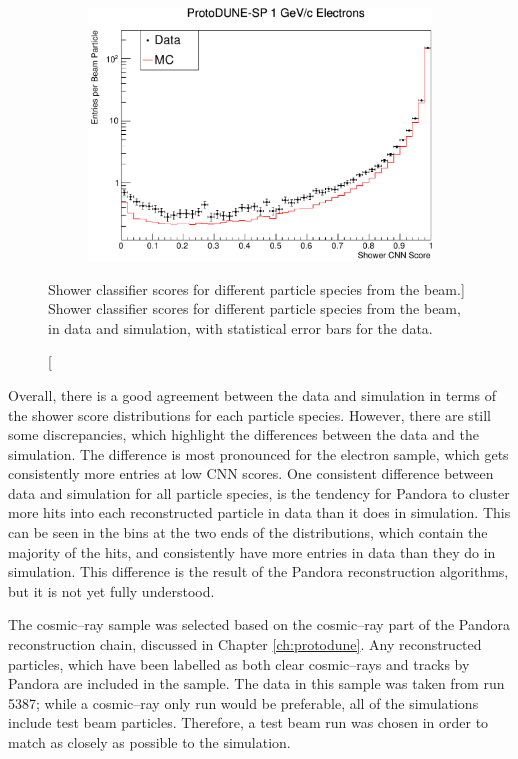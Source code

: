 \begin{figure}
	\begin{subfigure}[b]{0.64\textwidth}
		\centering
		\includegraphics[width=\textwidth]{figures/hit_cnn_electron.pdf}
		\label{fig:beam_electron_cnn}
	\end{subfigure}

	\caption
	[Shower classifier scores for different particle species from the \protodune{} 
	beam.]
	{Shower classifier scores for different particle species from the \protodune{} 
	beam, in data and simulation, with statistical error bars for the data.}
	\label{fig:cnn_scores_beam}

\end{figure}

Overall, there is a good agreement between the data and simulation in terms of
the shower score distributions for each particle species. However, there are
still some discrepancies, which highlight the differences between the data and
the simulation. The difference is most pronounced for the electron sample, which
gets consistently more entries at low CNN scores. One consistent difference
between data and simulation for all particle species, is the tendency for 
Pandora to cluster more hits into each reconstructed particle in data than it 
does in simulation. This can be seen in the bins at the two ends of the 
distributions, which contain the majority of the hits, and consistently have 
more entries in data than they do in simulation. This difference is the result
of the Pandora reconstruction algorithms, but it is not yet fully understood.

The cosmic--ray sample was selected based on the cosmic--ray part of the
Pandora reconstruction chain, discussed in Chapter \ref{ch:protodune}. Any
reconstructed particles, which have been labelled as both clear cosmic--rays
and tracks by Pandora are included in the sample. The data in this sample was
taken from run 5387; while a cosmic--ray only run would be preferable, all of 
the \protodune{} simulations include test beam particles. Therefore, a test beam
run was chosen in order to match as closely as possible to the simulation.

